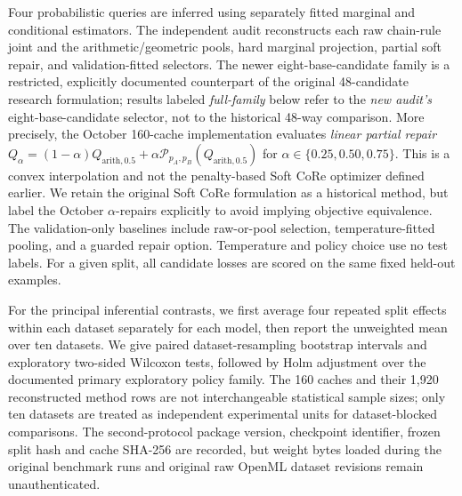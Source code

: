 \documentclass[a4paper,fleqn]{cas-sc}
\begin{document}
Four probabilistic queries are inferred using separately fitted marginal and conditional estimators. The independent audit reconstructs each raw chain-rule joint and the arithmetic/geometric pools, hard marginal projection, partial soft repair, and validation-fitted selectors. The newer eight-base-candidate family is a restricted, explicitly documented counterpart of the original 48-candidate research formulation; results labeled \emph{full-family} below refer to the \emph{new audit's} eight-base-candidate selector, not to the historical 48-way comparison. More precisely, the October 160-cache implementation evaluates \emph{linear partial repair} $Q_{\alpha}=(1-\alpha)Q_{\mathrm{arith},0.5}+\alpha\mathcal{P}_{p_A,p_B}(Q_{\mathrm{arith},0.5})$ for $\alpha\in\{0.25,0.50,0.75\}$. This is a convex interpolation and not the penalty-based Soft CoRe optimizer defined earlier. We retain the original Soft CoRe formulation as a historical method, but label the October $\alpha$-repairs explicitly to avoid implying objective equivalence. The validation-only baselines include raw-or-pool selection, temperature-fitted pooling, and a guarded repair option. Temperature and policy choice use no test labels. For a given split, all candidate losses are scored on the same fixed held-out examples.

For the principal inferential contrasts, we first average four repeated split effects within each dataset separately for each model, then report the unweighted mean over ten datasets. We give paired dataset-resampling bootstrap intervals and exploratory two-sided Wilcoxon tests, followed by Holm adjustment over the documented primary exploratory policy family. The 160 caches and their 1,920 reconstructed method rows are not interchangeable statistical sample sizes; only ten datasets are treated as independent experimental units for dataset-blocked comparisons. The second-protocol package version, checkpoint identifier, frozen split hash and cache SHA-256 are recorded, but weight bytes loaded during the original benchmark runs and original raw OpenML dataset revisions remain unauthenticated.
\end{document}
